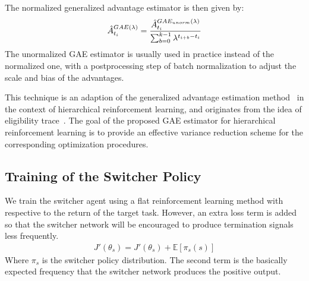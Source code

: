 The normalized generalized advantage estimator is then given by:
\begin{align}
\hat{A}_{t_i}^{GAE(\lambda)}
= \frac{\hat{A}_{t_i}^{GAE_{unorm}(\lambda)}}{\sum_{b=0}^{k-1} \lambda^{t_{i+b}-t_i}}
\end{align}
The unormalized GAE estimator is usually used in practice instead of the normalized one, with a postprocessing step of batch normalization to adjust the scale and bias of the advantages.

This technique is an adaption of the generalized advantage estimation method~\cite{schulman2015high} in the context of hierarchical reinforcement learning, and originates from the idea of eligibility trace~\cite{rlintro_sutton1998reinforcement}. The goal of the proposed GAE estimator for hierarchical reinforcement learning is to provide an effective variance reduction scheme for the corresponding optimization procedures.

\subsection{Training of the Switcher Policy}
We train the switcher agent using a flat reinforcement learning method with respective to the return of the target task. However, an extra loss term is added so that the switcher network will be encouraged to produce termination signals less frequently.
\begin{align}
J'(\theta_s) = J'(\theta_s) + \mathbb{E}[\pi_s(s)]
\end{align}
Where $\pi_s$ is the switcher policy distribution. The second term is the basically expected frequency that the switcher network produces the positive output.

